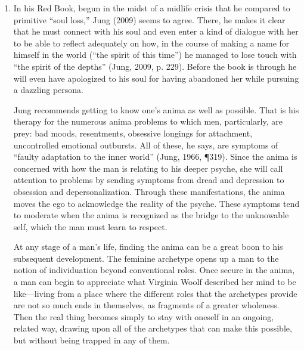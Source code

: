 \begin{enumerate}
\item {} In his Red Book, begun in the
midst of a midlife crisis that he compared to primitive ``soul loss,'' Jung
(2009) seems to agree. There, he makes it clear that he must connect with his
soul and even enter a kind of dialogue with her to be able to reflect
adequately on how, in the course of making a name for himself in the world
(``the spirit of this time'') he managed to lose touch with ``the spirit of the
depths'' (Jung, 2009, p. 229). Before the book is through he will even have
apologized to his soul for having abandoned her while pursuing a dazzling
persona.

Jung recommends getting to know one's anima as well as possible. That is his
therapy for the numerous anima problems to which men, particularly, are prey:
bad moods, resentments, obsessive longings for attachment, uncontrolled
emotional outbursts. All of these, he says, are symptoms of ``faulty adaptation
to the inner world'' (Jung, 1966, ¶319). Since the anima is concerned with how
the man is relating to his deeper psyche, she will call attention to problems
by sending symptoms from dread and depression to obsession and
depersonalization. Through these manifestations, the anima moves the ego to
acknowledge the reality of the psyche. These symptoms tend to moderate when the
anima is recognized as the bridge to the unknowable self, which the man must
learn to respect.

At any stage of a man's life, finding the anima can be a great boon to his
subsequent development. The feminine archetype opens up a man to the notion of
individuation beyond conventional roles. Once secure in the anima, a man can
begin to appreciate what Virginia Woolf described her mind to be like—living
from a place where the different roles that the archetypes provide are not so
much ends in themselves, as fragments of a greater wholeness. Then the real
thing becomes simply to stay with oneself in an ongoing, related way, drawing
upon all of the archetypes that can make this possible, but without being
trapped in any of them.

\end{enumerate}
